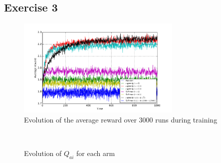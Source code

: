 \documentclass[a4paper]{article}
\begin{document}
\subsection{Exercise 3}
\begin{figure}[H]
	\centering
	\includegraphics[width=0.7\textwidth]{./fig/ex1-3.pdf}
	\caption{Evolution of the average reward over 3000 runs during training}
	\label{ex13perf}
\end{figure}
\begin{figure}[H]
	\centering
	\\
	\caption{Evolution of $Q_{ai}$ for each arm}
	\label{ex13q}
\end{figure}
\end{document}
